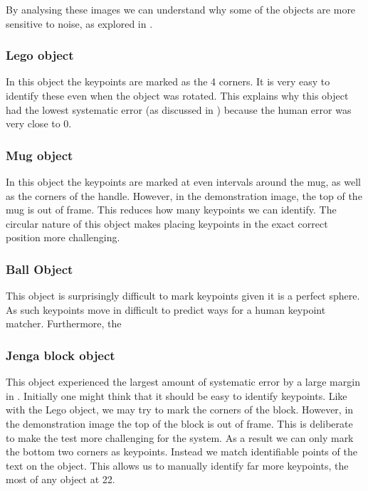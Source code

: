 By analysing these images we can understand why some of the objects are more sensitive to noise, as explored in .

\subsubsection{Lego object}
In this object the keypoints are marked as the 4 corners. It is very easy to identify these even when the object was rotated. This explains why this object had the lowest systematic error (as discussed in ) because the human error was very close to 0.

\subsubsection{Mug object}
In this object the keypoints are marked at even intervals around the mug, as well as the corners of the handle. However, in the demonstration image, the top of the mug is out of frame. This reduces how many keypoints we can identify. The circular nature of this object makes placing keypoints in the exact correct position more challenging.

\subsubsection{Ball Object}
This object is surprisingly difficult to mark keypoints given it is a perfect sphere. As such keypoints move in difficult to predict ways for a human keypoint matcher. Furthermore, the 

\subsubsection{Jenga block object}
This object experienced the largest amount of systematic error by a large margin in . Initially one might think that it should be easy to identify keypoints. Like with the Lego object, we may try to mark the corners of the block. However, in the demonstration image the top of the block is out of frame. This is deliberate to make the test more challenging for the system. As a result we can only mark the bottom two corners as keypoints. Instead we match identifiable points of the text on the object. This allows us to manually identify far more keypoints, the most of any object at 22.

